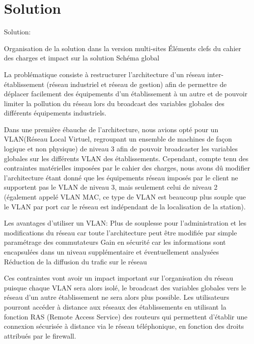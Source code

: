 \section{Solution}

Solution:

Organisation de la solution dans la version multi-sites
Éléments clefs du cahier des charges et impact sur la solution
Schéma global

La problématique consiste à restructurer l'architecture d'un réseau
inter-établissement (réseau industriel et réseau de gestion) afin de
permettre de déplacer facilement des équipements d'un établissement
à un autre et de pouvoir limiter la pollution du réseau lors du broadcast
des variables globales des différents équipements industriels.

Dans une première ébauche de l'architecture, nous avions opté pour un
VLAN(Réseau Local Virtuel, regroupant un ensemble de machines de façon
logique et non physique) de niveau 3 afin de pouvoir broadcaster les variables
globales sur les différents VLAN des établissements. Cependant, compte tenu des
contraintes matérielles imposées par le cahier des charges, nous avons dû
modifier l'architecture étant donné que les équipements réseau imposés par le
client ne supportent pas le VLAN de niveau 3, mais seulement celui de niveau 2
(également appelé VLAN MAC, ce type de VLAN est beaucoup plus souple  que le
VLAN par port car le réseau est indépendant de la localisation de la station). 


Les avantages d'utiliser un VLAN:
Plus de souplesse pour l'administration et les modifications du réseau car toute
l'architecture peut être modifiée par simple paramétrage des commutateurs
Gain en sécurité car les informations sont encapsulées dans un niveau
supplémentaire et éventuellement analysées
Réduction de la diffusion du trafic sur le réseau

Ces contraintes vont avoir un impact important sur l'organisation du réseau
puisque chaque VLAN sera alors isolé, le broadcast des variables globales vers
le réseau d'un autre établissement ne sera alors plus possible. 
Les utilisateurs pourront accéder à distance aux réseaux des établissements en
utilisant la fonction RAS (Remote Access Service) des routeurs qui permettent
d'établir une connexion sécurisée à  distance via le réseau téléphonique, en
fonction des droits attribués par le firewall. 

